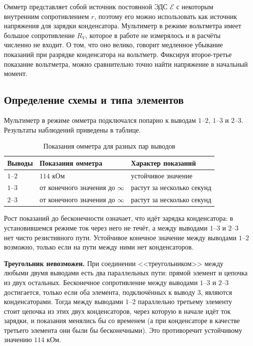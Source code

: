 \documentclass[12pt]{article}
\begin{document}
    Омметр представляет собой источник постоянной ЭДС $\mathcal{E}$ с некоторым внутренним сопротивлением $r$, поэтому его можно использовать как источник напряжения для зарядки конденсатора. Мультиметр в режиме вольтметра имеет большое сопротивление $R_V$, которое в работе не измерялось и в расчёты численно не входит. О том, что оно велико, говорит медленное убывание показаний при разрядке конденсатора на вольтметр. Фиксируя второе-третье показание вольтметра, можно сравнительно точно найти напряжение в начальный момент.

    \subsection{Определение схемы и типа элементов}

    Мультиметр в режиме омметра подключался попарно к выводам $1$--$2$, $1$--$3$ и $2$--$3$. Результаты наблюдений приведены в таблице.

    \begin{table}[H]
        \centering
        \begin{xltabular}{\textwidth}{@{}lXX@{}}
            \toprule
            Выводы & Показания омметра & Характер показаний\\
            \midrule
            $1$--$2$ & $114$ кОм & устойчивое значение\\
            $1$--$3$ & от конечного значения до $\infty$ & растут за несколько секунд\\
            $2$--$3$ & от конечного значения до $\infty$ & растут за несколько секунд\\
            \bottomrule
        \end{xltabular}
        \caption{Показания омметра для разных пар выводов}
        \label{tab:ohm}
    \end{table}

    Рост показаний до бесконечности означает, что идёт зарядка конденсатора: в установившемся режиме ток через него не течёт, а между выводами $1$--$3$ и $2$--$3$ нет чисто резистивного пути. Устойчивое конечное значение между выводами $1$--$2$ возможно, только если на пути между ними нет конденсаторов.

    \textbf{Треугольник невозможен.} При соединении <<треугольником>> между любыми двумя выводами есть два параллельных пути: прямой элемент и цепочка из двух остальных. Бесконечное сопротивление между выводами $1$--$3$ и $2$--$3$ достигается, только если оба элемента, подключённых к выводу $3$, являются конденсаторами. Тогда между выводами $1$--$2$ параллельно третьему элементу стоит цепочка из этих двух конденсаторов, через которую в начале идёт ток зарядки, и показания менялись бы со временем (а при конденсаторе в качестве третьего элемента они были бы бесконечными). Это противоречит устойчивому значению $114$ кОм.
\end{document}
